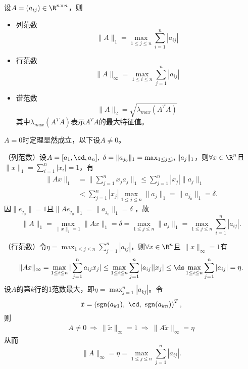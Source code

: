 \begin{frame}\ft{\subsecname}


\begin{dingli}
设$A=(a_{ij})\in\R^{n\times n}$，则
\begin{itemize}
\item 
\textcolor{acolor5}{列范数} 
$$
\|A\|_1 = \max_{1\le j \le n} \sum_{i=1}^n |a_{ij}|
$$
\item
\textcolor{acolor5}{行范数}  
$$
\|A\|_{\infty} = \max_{1\le i \le n} \sum_{j=1}^n |a_{ij}|
$$
\item
\textcolor{acolor5}{谱范数}
$$
\|A\|_2 = \sqrt{\lambda_{max}(A^TA)}
$$
其中$\lambda_{max}(A^TA)$表示$A^TA$的最大特征值。
\end{itemize}

\end{dingli}

\end{frame}

\begin{frame}\ft{\subsecname}

\begin{zhengming}
$A=0$时定理显然成立，以下设$A\ne 0$。 \pause

\textcolor{acolor4}{（列范数）}设$A = [a_1, \cd, a_n], 
~\delta = \|a_{j_0}\|_1 = \max_{1\le j \le n}\|a_j\|_1$，则$\forall  x \in \R^n$且$\|x\|_1 = \sum_{i=1}^n |x_i| = 1$，有
$$
\begin{aligned}
\|Ax\|_1 & =\| \sum_{j=1}^n  x_j a_{j}\|_1 \le \sum_{j=1}^n |x_j| \|a_{j}\|_1  \\ 
&< \sum_{j=1}^n|x_j| \max_{1\le j \le n} \|a_j\|_1 = \|a_{j_0}\|_1 = \delta.
\end{aligned}
$$
因$\|e_{j_0}\|=1$且$\|Ae_{j_0}\|_1 = \|a_{j_0}\|_1 = \delta$
，故
$$
 \|A\|_1 = \max_{\|x\|_1=1}\|Ax\|_1 = \delta = \max_{1\le j \le n} \|a_j\|_1 = \max_{1\le j \le n} \sum_{i=1}^n|a_{ij}|.
$$
\end{zhengming}
\end{frame}

\begin{frame}\ft{\subsecname}

\begin{zhengming}
\textcolor{acolor4}{（行范数）}令$\eta = \max_{1\le j \le n} \sum_{j=1}^n |a_{ij}|$，则$\forall  x \in \R^n$且 $\|x\|_{\infty}  = 1$有
$$
\|Ax\|_{\infty} =   \max_{1\le i \le n}| \sum_{j=1}^n   a_{ij} x_j| 
\le \max_{1\le i \le n} \sum_{j=1}^n |a_{ij}||x_j|   
\le \ds  \max_{1\le i \le n}  \sum_{j=1}^n |a_{ij}|  = \eta.
$$
\pause 
设$A$的第$k$行的1范数最大，即$\eta = \max_{j=1}^n |a_{kj}|$。令
$$
\tilde{x} = \left(\mathrm{sgn}(a_{k1}),~\cd,~\mathrm{sgn}(a_{kn})\right)^T,
$$
则 \pause 
$$
\begin{array}{l}
A \ne 0 ~\Longrightarrow~ \|\tilde{x}\|_{\infty} = 1 
~\Longrightarrow~ \|A\tilde{x}\|_{\infty} = \eta
\end{array}
$$ 
\pause
从而
$$
\|A\|_{\infty} = \eta =  \max_{1\le j \le n} \sum_{j=1}^n |a_{ij}|.
$$
\end{zhengming}
\end{frame}

